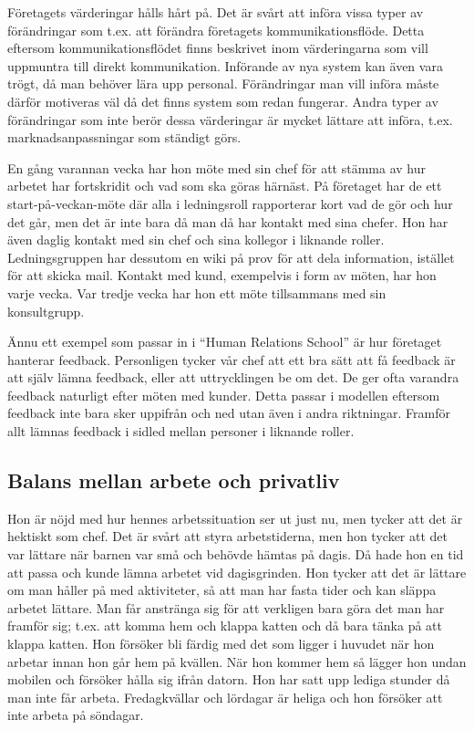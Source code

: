 \documentclass[a4paper,10pt,twoside]{article}
\begin{document}
Företagets värderingar hålls hårt på. Det är svårt att införa vissa typer av förändringar som t.ex. att förändra företagets kommunikationsflöde. Detta eftersom kommunikationsflödet finns beskrivet inom värderingarna som vill uppmuntra till direkt kommunikation. Införande av nya system kan även vara trögt, då man behöver lära upp personal. Förändringar man vill införa måste därför motiveras väl då det finns system som redan fungerar. Andra typer av förändringar som inte berör dessa värderingar är mycket lättare att införa, t.ex. marknadsanpassningar som ständigt görs.

En gång varannan vecka har hon möte med sin chef för att stämma av hur arbetet har fortskridit och vad som ska göras härnäst. På företaget har de ett start-på-veckan-möte där alla i ledningsroll rapporterar kort vad de gör och hur det går, men det är inte bara då man då har kontakt med sina chefer. Hon har även daglig kontakt med sin chef och sina kollegor i liknande roller. Ledningsgruppen har dessutom en wiki på prov för att dela information, istället för att skicka mail. Kontakt med kund, exempelvis i form av möten, har hon varje vecka. Var tredje vecka har hon ett möte tillsammans med sin konsultgrupp.

Ännu ett exempel som passar in i “Human Relations School” är hur företaget hanterar feedback. Personligen tycker vår chef att ett bra sätt att få feedback är att själv lämna feedback, eller att uttrycklingen be om det. De ger ofta varandra feedback naturligt efter möten med kunder. Detta passar i modellen eftersom feedback inte bara sker uppifrån och ned utan även i andra riktningar. Framför allt lämnas feedback i sidled mellan personer i liknande roller.


\subsection{Balans mellan arbete och privatliv} %
\label{sub:balans_mellan_arbete_och_privatliv}
Hon är nöjd med hur hennes arbetssituation ser ut just nu, men tycker att det är hektiskt som chef. Det är svårt att styra arbetstiderna, men hon tycker att det var lättare när barnen var små och behövde hämtas på dagis. Då hade hon en tid att passa och kunde lämna arbetet vid dagisgrinden. Hon tycker att det är lättare om man håller på med aktiviteter, så att man har fasta tider och kan släppa arbetet lättare. Man får anstränga sig för att verkligen bara göra det man har framför sig; t.ex. att komma hem och klappa katten och då bara tänka på att klappa katten. Hon försöker bli färdig med det som ligger i huvudet när hon arbetar innan hon går hem på kvällen. När hon kommer hem så lägger hon undan mobilen och försöker hålla sig ifrån datorn. Hon har satt upp lediga stunder då man inte får arbeta. Fredagkvällar och lördagar är heliga och hon försöker att inte arbeta på söndagar.
\end{document}

